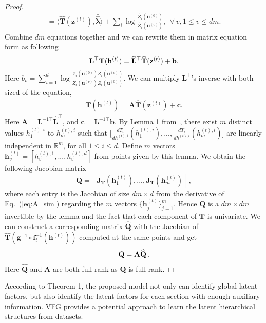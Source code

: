 \documentclass[twoside]{article}
\begin{document}
\begin{proof}
\begin{align}
=\langle \widehat{\mathbf{T}}(\mathbf{z}^{(t)}), \bar{\widehat{\mathbf{\lambda}}}	\rangle + \sum_i\log \frac{\widehat{Z}_i(\mathbf{u}^{(0)})}{\widehat{Z}_i(\mathbf{u}^{(v)})}, \ \ \forall \ v, 1 \leqslant v \leqslant dm .
\end{align}
Combine $dm$ equations together and we can rewrite them in matrix equation form as following
\begin{align} \notag
\mathbf{L}^{\top}\mathbf{T}(\mathbf{h}^{(t)}) = \widehat{\mathbf{L}}^{\top}\widehat{\mathbf{T}}(\mathbf{z}^{(t)}) + \mathbf{b}.
\end{align}
Here $b_v=\sum_{i=1}^{d}\log \frac{\widehat{Z}_i(\mathbf{u}^{(0)}) Z_i(\mathbf{u}^{(v)}) }{\widehat{Z}_i(\mathbf{u}^{(v)}) Z_i(\mathbf{u}^{(0)}) }$. We can multiply $\mathbf{L}^{\top}$'s inverse with both sized of the equation, 
\begin{align}\label{eq:A_sim}
\mathbf{T}(\mathbf{h}^{(t)}) = \mathbf{A}\widehat{\mathbf{T}}(\mathbf{z}^{(t)}) + \mathbf{c}.
\end{align}
Here $\mathbf{A} = \mathbf{L}^{-1\top} \widehat{\mathbf{L}}^{\top} $, and $\mathbf{c} = \mathbf{L}^{-1\top} \mathbf{b}$. 
By Lemma 1 from~\cite{Khemakhem20a}, there exist $m$ distinct values $h^{(t),i}_{1}$ to $h^{(t),i}_{m}$ such that $\big[ \frac{d T_i}{ d h^{(t),i}}(h^{(t),i}_{1}), ...,  \frac{d T_i}{ d h^{(t),i}}(h^{(t),i}_{m}) \big]$ are linearly independent in $\mathbb{R}^m$, for all $1\leqslant i \leqslant d$. 
Define $m$ vectors $\mathbf{h}^{(t)}_{v}= [h^{(t),1}_v, ..., h^{(t),d}_v]$ from points given by this lemma. 
We obtain the following Jacobian matrix
$$\mathbf{Q}= [\mathbf{J}_{\mathbf{T}}(\mathbf{h}^{(t)}_1), ..., \mathbf{J}_{\mathbf{T}}(\mathbf{h}^{(t)}_m)] \, ,$$ 
where each entry is the Jacobian of size $dm \times d$ from the derivative of Eq.~(\ref{eq:A_sim}) regarding the $m$ vectors $\{\mathbf{h}^{(t)}_j\}_{j=1}^m$. 
Hence $\mathbf{Q}$ is a $dm \times dm$ invertible by the lemma and the fact that each component of $\mathbf{T}$ is univariate. %
We can construct a corresponding matrix $\widehat{\mathbf{Q}}$ with the Jacobian of $\widehat{\mathbf{T}}(\mathbf{g}^{-1}\circ \mathbf{f}_t^{-1}(\mathbf{h}^{(t)}))$ computed at the same points and get 
\begin{align} \notag
\mathbf{Q} = \mathbf{A}\widehat{\mathbf{Q}} \,.
\end{align}
Here $\widehat{\mathbf{Q}}$ and $\mathbf{A}$ are both full rank as $\mathbf{Q}$ is full rank.
\end{proof}

According to Theorem 1, the proposed model not only can identify global latent factors, but also identify the latent factors for each section with enough auxiliary information. 
VFG provides a potential approach to learn the latent hierarchical structures from datasets.
\end{document}
